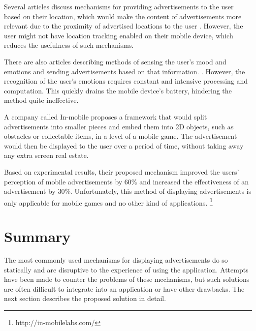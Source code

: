 Several articles discuss mechanisms for providing advertisements to the user based on their location, which would make the content of advertisements more relevant due to the proximity of advertised locations to the user \cite{hristova2004adme}\cite{aalto2004btandwap}. However, the user might not have location tracking enabled on their mobile device, which reduces the usefulness of such mechanisms.

There are also articles describing methods of sensing the user's mood and emotions and sending advertisements based on that information.  \cite{hristova2004adme}\cite{likamwa2013moodscope}. However, the recognition of the user's emotions requires constant and intensive processing and computation. This quickly drains the mobile device's battery, hindering the method quite ineffective.

A company called In-mobile proposes a framework that would split advertisements into smaller pieces and embed them into 2D objects, such as obstacles or collectable items, in a level of a mobile game. The advertisement would then be displayed to the user over a period of time, without taking away any extra screen real estate.

Based on experimental results, their proposed mechanism improved the users' perception of mobile advertisements by 60\% and increased the effectiveness of an advertisement by 30\%. Unfortunately, this method of displaying advertisements is only applicable for mobile games and no other kind of applications. \footnote{http://in-mobilelabs.com/}

\section{Summary}

The most commonly used mechanisms for displaying advertisements do so statically and are disruptive to the experience of using the application. Attempts have been made to counter the problems of these mechanisms, but such solutions are often difficult to integrate into an application or have other drawbacks. The next section describes the proposed solution in detail.